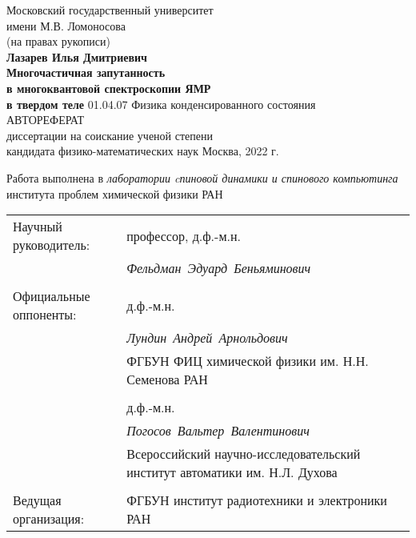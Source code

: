 \begin{titlepage}
\vfill
\begin{center}
  {\large
    Московский государственный университет \\
    имени М.В. Ломоносова
  } \\
  \vfill
  (на правах рукописи) \\
  \vfill
  {\Large \bf Лазарев Илья Дмитриевич} \\
  \vspace{1cm}
  {\Large \bf
      Многочастичная запутанность \\
      в многоквантовой спектроскопии ЯМР \\
      \vspace{2mm}
      в твердом теле
  }
 \vfill
 01.04.07 Физика конденсированного состояния \\
 \vspace{1cm}
 АВТОРЕФЕРАТ \\
 диссертации на соискание ученой степени \\
 кандидата физико-математических наук
 \vfill
 Москва, 2022 г.
\end{center}
\end{titlepage}

Работа выполнена в \textit{лаборатории cпиновой динамики и спинового компьютинга} института проблем химической физики РАН

\vfill

\begin{tabularx}{\textwidth}{
  >{\raggedright\arraybackslash}X
  >{\raggedright\arraybackslash}X
}%
Научный руководитель: & профессор, д.ф.-м.н. \\
 & \mbox{\textit{Фельдман Эдуард Беньяминович}} \\
 & \\
Официальные оппоненты: &  д.ф.-м.н.\\
 & \mbox{\textit{Лундин Андрей Арнольдович}} \\
 & ФГБУН ФИЦ химической физики им. Н.Н. Семенова РАН \\
 & \\
 & д.ф.-м.н. \\
 & \mbox{\textit{Погосов Вальтер Валентинович}} \\
 & Всероссийский научно-исследовательский институт автоматики им. Н.Л. Духова \\
 & \\
 Ведущая организация: & ФГБУН институт радиотехники и электроники РАН
\end{tabularx}

